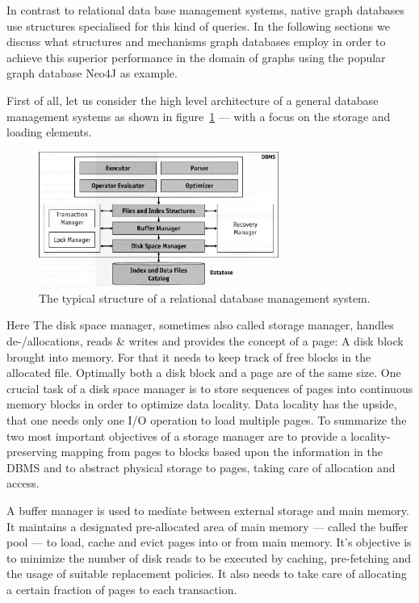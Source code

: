         In contrast to relational data base management systems, native graph databases use structures specialised for this kind of queries.
        In the following sections we discuss what structures and mechanisms graph databases employ in order to achieve this superior performance in the domain of graphs using the popular graph database Neo4J as example.

        First of all, let us consider the high level architecture of a general database management systems as shown in figure~\ref{dbms_arch} --- with a focus on the storage and loading elements.

        \begin{figure}[htp]\label{dbms_arch}
        \begin{center}
        \includegraphics[keepaspectratio,width=0.7\textwidth]{img/00_intro/RDBMS.png}
        \end{center}
        \caption{The typical structure of a relational database management system.} %
        \end{figure}

        Here The disk space manager, sometimes also called storage manager, handles de-/allocations, reads \& writes and provides the concept of a page: A disk block brought into memory. 
        For that it needs to keep track of free blocks in the allocated file. Optimally both a disk block and a page are of the same size. 
        One crucial task of a disk space manager is to store sequences of pages into continuous memory blocks in order to optimize data locality.
        Data locality has the upside, that one needs only one I/O operation to load multiple pages.
        To summarize the two most important objectives of a storage manager are to provide a locality-preserving mapping from pages to blocks based upon the information in the DBMS and to abstract physical storage to pages, taking care of allocation and access.
        
        A buffer manager is used to mediate between external storage and main memory. It maintains a designated pre-allocated area of main memory --- called the buffer pool --- to load, cache and evict pages into or from main memory.
        It's objective is to minimize the number of disk reads to be executed by caching, pre-fetching and the usage of suitable replacement policies. 
        It also needs to take care of allocating a certain fraction of pages to each transaction.

